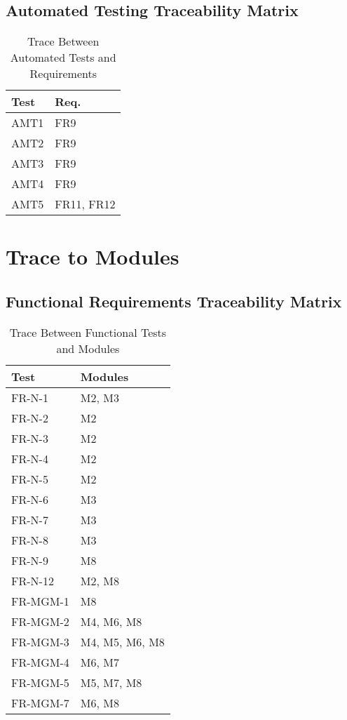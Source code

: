\documentclass[12pt, titlepage]{article}
\begin{document}
\newpage

\subsection{Automated Testing Traceability Matrix}
\begin{table}[H]
\centering
\begin{tabular}{p{} p{}}
\toprule
\textbf{Test} & \textbf{Req.}\\
\midrule
AMT1 & FR9\\
AMT2 & FR9\\
AMT3 & FR9\\
AMT4 & FR9\\
AMT5 & FR11, FR12\\
\bottomrule
\end{tabular}
\caption{Trace Between Automated Tests and Requirements}
\label{TblTATR}
\end{table}

\newpage

\section{Trace to Modules}

\subsection{Functional Requirements Traceability Matrix}
\begin{table}[H]
\centering
\begin{tabular}{p{} p{}}
\toprule
\textbf{Test} & \textbf{Modules}\\
\midrule
FR-N-1 & M2, M3\\
FR-N-2 & M2\\
FR-N-3 & M2\\
FR-N-4 & M2\\
FR-N-5 & M2\\
FR-N-6 & M3\\
FR-N-7 & M3\\
FR-N-8 & M3\\
FR-N-9 & M8\\
FR-N-12 & M2, M8\\
FR-MGM-1 & M8\\
FR-MGM-2 & M4, M6, M8\\
FR-MGM-3 & M4, M5, M6, M8\\
FR-MGM-4 & M6, M7\\
FR-MGM-5 & M5, M7, M8\\
FR-MGM-7 & M6, M8\\
\bottomrule
\end{tabular}
\caption{Trace Between Functional Tests and Modules}
\label{TblFTM}
\end{table}
\end{document}
